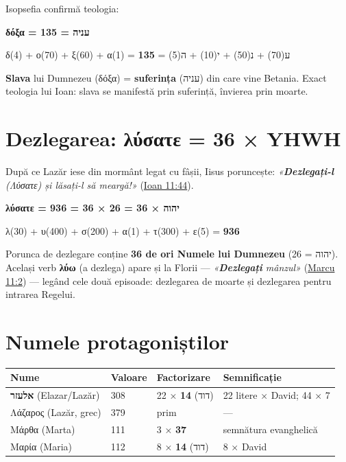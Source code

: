 \documentclass[12pt,a4paper,twoside,openany]{book}
\begin{document}
Isopsefia confirmă teologia:

\begin{center}
\large\bfseries δόξα = 135 = עניה
\end{center}

\begin{center}
δ(4) + ο(70) + ξ(60) + α(1) = \textbf{135} = ע(70) + נ(50) + י(10) + ה(5)
\end{center}

\textbf{Slava} lui Dumnezeu (δόξα) = \textbf{suferința} (עניה) din care vine Betania. Exact teologia lui Ioan: slava se manifestă prin suferință, învierea prin moarte.

\section{Dezlegarea: λύσατε = 36 × YHWH}

După ce Lazăr iese din mormânt legat cu fâșii, Iisus poruncește: \textit{«\textbf{Dezlegați-l} (Λύσατε) și lăsați-l să meargă!»} (\href{https://bibliaortodoxa.ro/carte.php?id=35\&cap=11\#44}{Ioan 11:44}).

\begin{center}
\large\bfseries λύσατε = 936 = 36 × 26 = 36 × יהוה
\end{center}

\begin{center}
λ(30) + υ(400) + σ(200) + α(1) + τ(300) + ε(5) = \textbf{936}
\end{center}

Porunca de dezlegare conține \textbf{36 de ori Numele lui Dumnezeu} (יהוה = 26). Același verb \textbf{λύω} (a dezlega) apare și la Florii — \textit{«\textbf{Dezlegați} mânzul»} (\href{https://bibliaortodoxa.ro/carte.php?id=53\&cap=11\#2}{Marcu 11:2}) — legând cele două episoade: dezlegarea de moarte și dezlegarea pentru intrarea Regelui.

\section{Numele protagoniștilor}

\begin{center}
\small
\begin{tabularx}{\textwidth}{L{2.5cm}L{3cm}L{3cm}X}
\toprule
{}
\textbf{Nume} & \textbf{Valoare} & \textbf{Factorizare} & \textbf{Semnificație} \\
\midrule
\textbf{אלעזר} (Elazar/Lazăr) & 308 & 22 × \textbf{14} (דוד) & 22 litere × David; 44 × 7 \\
Λάζαρος (Lazăr, grec) & 379 & prim & — \\
Μάρθα (Marta) & 111 & 3 × \textbf{37} & semnătura evanghelică \\
Μαρία (Maria) & 112 & 8 × \textbf{14} (דוד) & 8 × David \\
\bottomrule
\end{tabularx}
\end{center}
\end{document}
